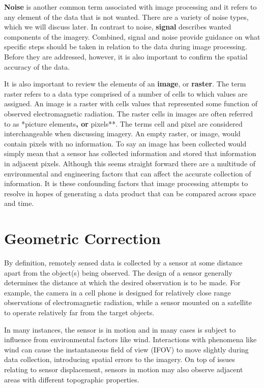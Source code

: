 \documentclass[
]{book}
\begin{document}
\textbf{Noise} is another common term associated with image processing and it
refers to any element of the data that is not wanted. There are a
variety of noise types, which we will discuss later. In contrast to
noise, \textbf{signal} describes wanted components of the imagery. Combined,
signal and noise provide guidance on what specific steps should be taken
in relation to the data during image processing. Before they are
addressed, however, it is also important to confirm the spatial accuracy
of the data.

It is also important to review the elements of an \textbf{image}, or \textbf{raster}.
The term raster refers to a data type comprised of a number of cells to
which values are assigned. An image is a raster with cells values that
represented some function of observed electromagnetic radiation. The
raster cells in images are often referred to as *picture elements\textbf{, or
}pixels**. The terms cell and pixel are considered interchangeable when
discussing imagery. An empty raster, or image, would contain pixels with
no information. To say an image has been collected would simply mean
that a sensor has collected information and stored that information in
adjacent pixels. Although this seems straight forward there are a
multitude of environmental and engineering factors that can affect the
accurate collection of information. It is these confounding factors that
image processing attempts to resolve in hopes of generating a data
product that can be compared across space and time.

\hypertarget{geometric-correction}{%
\section{Geometric Correction}\label{geometric-correction}}

By definition, remotely sensed data is collected by a sensor at some
distance apart from the object(s) being observed. The design of a sensor
generally determines the distance at which the desired observation is to
be made. For example, the camera in a cell phone is designed for
relatively close range observations of electromagnetic radiation, while
a sensor mounted on a satellite to operate relatively far from the
target objects.

In many instances, the sensor is in motion and in many cases is subject
to influence from environmental factors like wind. Interactions with
phenomena like wind can cause the instantaneous field of view (IFOV) to
move slightly during data collection, introducing spatial errors to the
imagery. On top of issues relating to sensor displacement, sensors in
motion may also observe adjacent areas with different topographic
properties.
\end{document}
